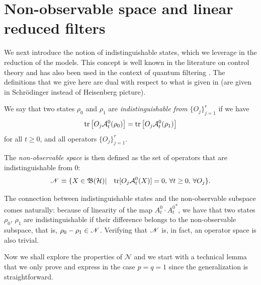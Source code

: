 \documentclass[aihp,12pt]{imsart}
\begin{document}
\section{Non-observable space and linear reduced filters}
\label{sec:observable_space}

We next introduce the notion of indistinguishable states, which we leverage in the reduction of the models. This concept is well known in the literature on control theory \cite{kalman,kalman1969topics,wonham,marrobasile} and has also been used in the context of quantum filtering \cite{vanhandel2008stabilityquantummarkovfilters}. The definitions that we give here are dual with respect to what is given in \cite{vanhandel2008stabilityquantummarkovfilters} (are given in Schr\"{o}dinger instead of Heisenberg picture).
\begin{definition}
    We say that two states $\rho_0$ and $\rho_1$ are \textit{indistinguishable from} $\{O_j\}_{j=1}^r$ if we have 
    \begin{equation}
        {\rm tr}\left[O_j \mathcal A_t^0(\rho_0)\right] = {\rm tr}\left[O_j \mathcal A_t^0(\rho_1) \right]
    \end{equation}
    for all $t\geq0$, and all operators $\{O_j\}_{j=1}^r$.
    
    \noindent The {\em non-observable space} is then defined as the set of operators that are indistinguishable from 0:
    \begin{equation}
        \mathscr{N} \equiv\{X\in\mathfrak{B}(\mathcal{H})|\quad {\rm tr}[O_j \mathcal A_t^0 (X)] = 0,\, \forall t\geq0, \, \forall O_j\}.
        \label{eq:non_observable_definition}
    \end{equation}
\end{definition}


The connection between indistinguishable states and the non-observable subspace comes naturally: because of linearity of the map $A_t^0 \cdot {A_t^0}^*$, we have that two states $\rho_0,\,\rho_1$ are indistinguishable if their difference belongs to the non-observable subspace, that is, $\rho_0-\rho_1\in\mathscr{N}$. Verifying that $\mathscr{N}$ is, in fact, an operator space is also trivial.

Now we shall explore the properties of $\mathcal N$ and we start with a technical lemma that we only prove and express in the case $p=q=1$ since the generalization is straightforward.
\end{document}
